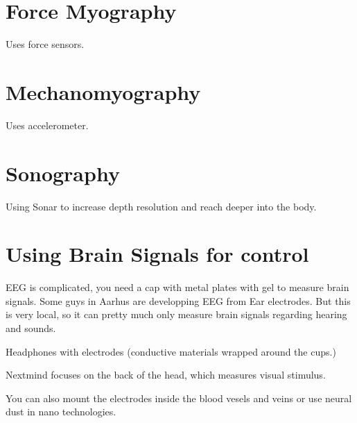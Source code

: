 \documentclass[a4paper]{article}
\begin{document}
\section{Force Myography}
Uses force sensors.



\section{Mechanomyography}
Uses accelerometer.


\section{Sonography}
Using Sonar to increase depth resolution and reach deeper into the body. 


\section{Using Brain Signals for control}
EEG is complicated, you need a cap with metal plates with gel to measure brain signals. Some guys in Aarhus are developping EEG from Ear electrodes. But this is very local, so it can pretty much only measure brain signals regarding hearing and sounds. 


Headphones with electrodes (conductive materials wrapped around the cups.)


Nextmind focuses on the back of the head, which measures visual stimulus. 

You can also mount the electrodes inside the blood vesels and veins or use neural dust in nano technologies. 
\end{document}
